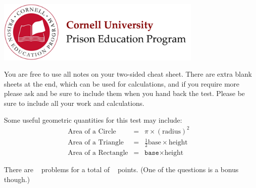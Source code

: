 \documentclass[addpoints,12pt]{exam}
\begin{document}

\begin{flushright}
\vspace{0.2in}

\end{flushright}

\begin{center}
\includegraphics[width=10cm]{../images/logo.png}
\end{center}

\begin{center}
\end{center}

\vspace{0.5in}

\begin{large}
You are free to use all notes on your two-sided cheat sheet. There are extra blank sheets at the end, which can be used for calculations, and if you require more please ask and be sure to include them when you hand back the test. Please be sure to include all your work and calculations.

Some useful geometric quantities for this test may include:
\begin{eqnarray}
\textrm{Area of a Circle} &=& \pi\times(\textrm{radius})^2 \nonumber \\
\textrm{Area of a Triangle} &=& \frac{1}{2}\textrm{base}\times\textrm{height}  \nonumber \\
\textrm{Area of a Rectangle} &=& \texttt{base}\times\textrm{height}\nonumber
\end{eqnarray}

There are \numquestions ~ problems for a total of \numpoints ~ points. (One of the questions is a bonus though.)
\end{large}
\vspace{0.2in}


 
\clearpage
\end{document}
